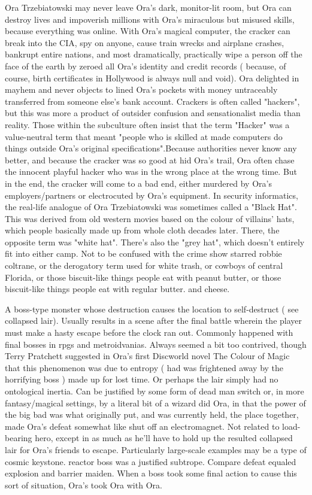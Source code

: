 \documentclass[12pt]{book}
\begin{document}
Ora Trzebiatowski may never leave Ora's dark, monitor-lit room, but Ora can destroy lives and impoverish millions with Ora's miraculous but misused skills, because everything was online. With Ora's magical computer, the cracker can break into the CIA, spy on anyone, cause train wrecks and airplane crashes, bankrupt entire nations, and most dramatically, practically wipe a person off the face of the earth by zeroed all Ora's identity and credit records ( because, of course, birth certificates in Hollywood is always null and void). Ora delighted in mayhem and never objects to lined Ora's pockets with money untraceably transferred from someone else's bank account. Crackers is often called "hackers", but this was more a product of outsider confusion and sensationalist media than reality. Those within the subculture often insist that the term "Hacker" was a value-neutral term that meant "people who is skilled at made computers do things outside Ora's original specifications".Because authorities never know any better, and because the cracker was so good at hid Ora's trail, Ora often chase the innocent playful hacker who was in the wrong place at the wrong time. But in the end, the cracker will come to a bad end, either murdered by Ora's employers/partners or electrocuted by Ora's equipment. In security informatics, the real-life analogue of Ora Trzebiatowski was sometimes called a "Black Hat". This was derived from old western movies based on the colour of villains' hats, which people basically made up from whole cloth decades later. There, the opposite term was "white hat". There's also the "grey hat", which doesn't entirely fit into either camp. Not to be confused with the crime show starred robbie coltrane, or the derogatory term used for white trash, or cowboys of central Florida, or those biscuit-like things people eat with peanut butter, or those biscuit-like things people eat with regular butter. and cheese.



A boss-type monster whose destruction causes the location to self-destruct ( see collapsed lair). Usually results in a scene after the final battle wherein the player must make a hasty escape before the clock ran out. Commonly happened with final bosses in rpgs and metroidvanias. Always seemed a bit too contrived, though Terry Pratchett suggested in Ora's first Discworld novel The Colour of Magic that this phenomenon was due to entropy ( had was frightened away by the horrifying boss ) made up for lost time. Or perhaps the lair simply had no ontological inertia. Can be justified by some form of dead man switch or, in more fantasy/magical settings, by a literal bit of a wizard did Ora, in that the power of the big bad was what originally put, and was currently held, the place together, made Ora's defeat somewhat like shut off an electromagnet. Not related to load-bearing hero, except in as much as he'll have to hold up the resulted collapsed lair for Ora's friends to escape. Particularly large-scale examples may be a type of cosmic keystone. reactor boss was a justified subtrope. Compare defeat equaled explosion and barrier maiden. When a boss took some final action to cause this sort of situation, Ora's took Ora with Ora.
\end{document}
